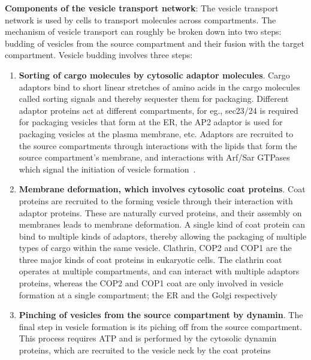 \textbf{Components of the vesicle transport network}:
The vesicle transport network is used by cells to transport molecules across compartments.
% 
The mechanism of vesicle transport can roughly be broken down into two steps: budding of vesicles from the source compartment and their fusion with the target compartment.
%
Vesicle budding involves three steps:
\begin{enumerate}
	\item  \textbf{Sorting of cargo molecules by cytosolic adaptor molecules}. 
	 Cargo adaptors bind to short linear stretches of amino acids in the cargo molecules called sorting signals and thereby sequester them for packaging. 
	 Different adaptor proteins act at different compartments, for eg., sec23/24 is required
	for packaging vesicles that form at the ER, the AP2 adaptor is used for packaging vesicles at the plasma membrane, etc. 
	Adaptors are recruited to the source compartments through interactions with
	the lipids that form the source compartment's membrane, and interactions with Arf/Sar GTPases which signal the initiation of vesicle formation~\cite{paczkowski2015cargo}.
	
	\item \textbf{Membrane deformation, which involves cytosolic coat proteins}.
	   Coat proteins are recruited to the forming vesicle through their interaction with adaptor proteins. 
	   These are naturally curved proteins, and their assembly on membranes leads to membrane deformation.
	   A single kind of coat protein can bind to multiple kinds of adaptors, thereby allowing the packaging of multiple types of cargo within the same vesicle. 
	   Clathrin, COP2 and COP1 are the three major kinds of coat proteins
	   in eukaryotic cells. 
	   The clathrin coat operates at multiple compartments, and can interact with
	   multiple adaptors proteins, whereas the COP2 and COP1 coat are only involved in vesicle formation at a single compartment; the ER and the Golgi respectively~\cite{faini2013vesicle}
	   
	   
	 \item \textbf{Pinching of vesicles from the source compartment by dynamin}.
	 The final step in vesicle formation is its piching off from the source compartment.
	 This process requires ATP and is performed by the cytosolic dynamin proteins, which are recruited to the vesicle neck by the coat proteins~\cite{cocucci2014dynamin}
\end{enumerate}

